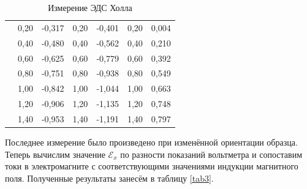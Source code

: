 \documentclass[a4paper,12pt]{article} %
\begin{document}
\begin{table}[H]
\begin{tabular}{l|cc|cc|cc|}
		& \multicolumn{1}{c|}{0,20}            & -0,317  & \multicolumn{1}{c|}{0,20}            & -0,401  & \multicolumn{1}{c|}{0,20}            & 0,004   \\ \cline{2-7} 
		& \multicolumn{1}{c|}{0,40}            & -0,480  & \multicolumn{1}{c|}{0,40}            & -0,562  & \multicolumn{1}{c|}{0,40}            & 0,210   \\ \cline{2-7} 
		& \multicolumn{1}{c|}{0,60}            & -0,625  & \multicolumn{1}{c|}{0,60}            & -0,779  & \multicolumn{1}{c|}{0,60}            & 0,392   \\ \cline{2-7} 
		& \multicolumn{1}{c|}{0,80}            & -0,751  & \multicolumn{1}{c|}{0,80}            & -0,938  & \multicolumn{1}{c|}{0,80}            & 0,549   \\ \cline{2-7} 
		& \multicolumn{1}{c|}{1,00}            & -0,842  & \multicolumn{1}{c|}{1,00}            & -1,044  & \multicolumn{1}{c|}{1,00}            & 0,663   \\ \cline{2-7} 
		& \multicolumn{1}{c|}{1,20}            & -0,906  & \multicolumn{1}{c|}{1,20}            & -1,135  & \multicolumn{1}{c|}{1,20}            & 0,748   \\ \cline{2-7} 
		& \multicolumn{1}{c|}{1,40}            & -0,953  & \multicolumn{1}{c|}{1,40}            & -1,191  & \multicolumn{1}{c|}{1,40}            & 0,797   \\ \cline{2-7} 
	\end{tabular}
	\caption{Измерение ЭДС Холла}
	\label{tab2}
\end{table}

Последнее измерение было произведено при изменённой ориентации образца. Теперь вычислим значение $ \mathcal{E}_x $ по разности показаний вольтметра и сопоставим токи в электромагните с соответствующими значениями индукции магнитного поля. Полученные результаты занесём в таблицу \ref{tab3}.
\end{document}
